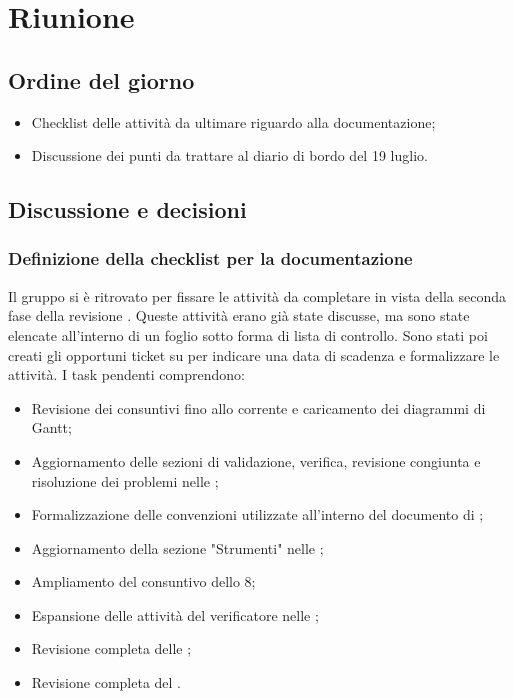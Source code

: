 \section{Riunione}
\subsection{Ordine del giorno}
\begin{itemize}
	\item Checklist delle attività da ultimare riguardo alla documentazione;
	\item Discussione dei punti da trattare al diario di bordo del 19 luglio.
\end{itemize}

\subsection{Discussione e decisioni}
\subsubsection{Definizione della checklist per la documentazione}
\par Il gruppo si è ritrovato per fissare le attività da completare in vista della seconda fase della revisione . Queste attività erano già state discusse, ma sono state elencate all'interno di un foglio  sotto forma di lista di controllo. Sono stati poi creati gli opportuni ticket su  per indicare una data di scadenza e formalizzare le attività. I task pendenti comprendono:
\begin{itemize}
	\item Revisione dei consuntivi fino allo  corrente e caricamento dei diagrammi di Gantt;
	\item Aggiornamento delle sezioni di validazione, verifica, revisione congiunta e risoluzione dei problemi nelle \NdP;
	\item Formalizzazione delle convenzioni utilizzate all'interno del documento di \AdR;
	\item Aggiornamento della sezione "Strumenti" nelle \NdP;
	\item Ampliamento del consuntivo dello  8;
	\item Espansione delle attività del verificatore nelle \NdP;
	\item Revisione completa delle \NdP;
	\item Revisione completa del \PdP.
\end{itemize} 

